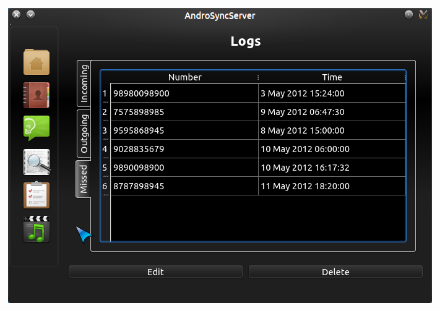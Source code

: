 \begin{figure}[H]
  \centering
    \includegraphics[height= 11cm, width=17cm]{project/images/AndroSyncServer/AndroSyncServer_CallLogsMissed}
\end{figure}

